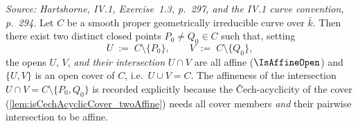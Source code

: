 \begin{lemma}

  \label{lem:exists_two_affine_cover}
  \textit{Source: Hartshorne, IV.1, Exercise~1.3, p.~297, and the IV.1
  curve convention, p.~294.}
  Let \(C\) be a smooth proper geometrically irreducible curve over
  \(\bar k\). Then there exist two distinct closed points
  \(P_0 \ne Q_0 \in C\) such that, setting
  \[
    U \;:=\; C \setminus \{P_0\}, \qquad V \;:=\; C \setminus \{Q_0\},
  \]
  the opens \(U\), \(V\), \emph{and their intersection} \(U \cap V\) are
  all affine (\(\IsAffineOpen\)) and \(\{U, V\}\) is an open cover of
  \(C\), i.e.\ \(U \cup V = C\). The affineness of the intersection
  \(U \cap V = C \setminus \{P_0, Q_0\}\) is recorded explicitly because
  the Čech-acyclicity of the cover (\cref{lem:isCechAcyclicCover_twoAffine})
  needs all cover members \emph{and} their pairwise intersection to be
  affine.
\end{lemma}

